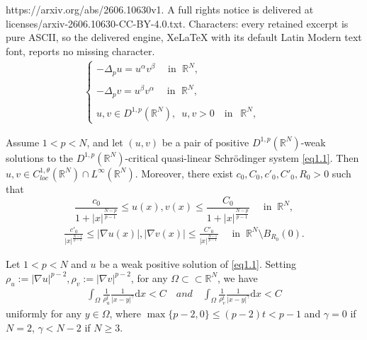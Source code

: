 \documentclass[10pt,a4paper]{amsart}
\newcommand{\R}{\mathbb{R}}
\begin{document}
https://arxiv.org/abs/2606.10630v1. A full rights notice is delivered at licenses/arxiv-2606.10630-CC-BY-4.0.txt. Characters: every retained excerpt is pure ASCII, so the delivered engine, XeLaTeX with its default Latin Modern text font, reports no missing character.
\begin{align}\label{eq1.1}
\left\{ \begin{array}{ll} \displaystyle
-\Delta_p u = u^{\alpha}v^{\beta}  \, \ \ \ \ \ \mbox{in}\,\ \ \R^N, \\ \\
-\Delta_p v = u^{\beta}v^{\alpha}  \,\  \ \ \ \ \mbox{in}\,\ \ \R^N, \\ \\
u, v \in D^{1,p}(\R^N),\,\,\,u, v>0 \quad \mbox{in}\,\, \ \ \R^N,
\end{array}
\right.\hspace{1cm}
\end{align}

\begin{thm}
\label{th2.1-}
Assume $1<p<N$, and let $(u,v)$ be a pair of positive $D^{1,p}(\R^{N})$-weak solutions to the $D^{1,p}(\mathbb{R}^{N})$-critical quasi-linear Schr\"{o}dinger system \eqref{eq1.1}. Then $u, v \in C_{loc}^{1,\theta} (\R^N) \cap L^\infty(\R^N)$. Moreover, there exist $c_0, C_0,c'_0, C'_0, R_0 > 0$ such that
\begin{equation}\label{eq0806}
  \frac{c_0}{1+|x|^\frac{N-p}{p-1}} \leq u(x) , v(x) \leq \frac{C_0}{1+|x|^\frac{N-p}{p-1}} \,\,\,\,\,\,\,\,\mbox{in}\,\,\ \R^N,
\end{equation}
\begin{align}\label{eq0806+}
   \frac{c'_0}{|x|^\frac{N-1}{p-1}} \leq |\nabla u(x)|, |\nabla v(x)|\leq \frac{C'_0}{|x|^\frac{N-1}{p-1}} \,\,\,\,\,\,\,\,\mbox{in}\,\,\ \R^N\setminus B_{R_0}(0).
\end{align}
\end{thm}

\begin{cor}\label{re2333}
Let $1<p<N$ and $u$ be a weak positive solution of \eqref{eq1.1}. Setting $\rho_u:=|\nabla u|^{p-2}, \rho_v:=|\nabla v|^{p-2}$, for any $\Omega \subset\subset\R^N$, we have
\begin{align}\label{eq10.25.2}
\int_{\Omega} \frac{1}{\rho_u^t} \frac{1}{|x-y|^\gamma}\mathrm{d}x < C \quad and \quad \int_{\Omega} \frac{1}{\rho_v^t} \frac{1}{|x-y|^\gamma}\mathrm{d}x < C
\end{align}
uniformly for any $y\in\Omega$, where $\max\{p-2,0\}\leq (p-2)t<p-1$ and $\gamma=0$ if $N=2$, $\gamma<N-2$ if $N \geq 3$.
\end{cor}
\end{document}
